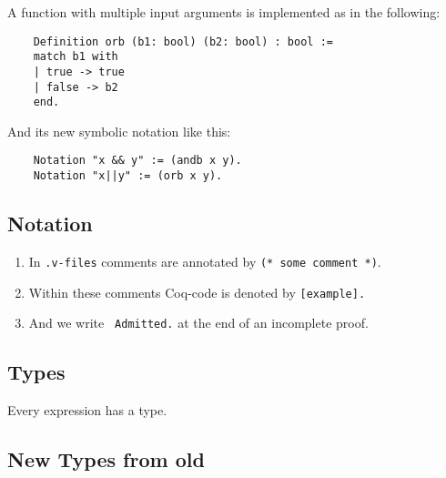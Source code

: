     A function with multiple input arguments is implemented as in the following:
    \begin{lstlisting}
    Definition orb (b1: bool) (b2: bool) : bool :=
    match b1 with
    | true -> true
    | false -> b2
    end.
    \end{lstlisting}
     
    And its new symbolic notation like this:
    \begin{lstlisting}
    Notation "x && y" := (andb x y).
    Notation "x||y" := (orb x y).
    \end{lstlisting}
    
     
\subsection{Notation}
     
    \begin{enumerate}
     \item In \texttt{.v-files} comments are annotated by \lstinline!(* some comment *)!. 
     \item Within these comments Coq-code is denoted by \lstinline![example].! 
     \item And we write \lstinline! Admitted.! at the end of an incomplete proof.    
     \end{enumerate}
     
     
\subsection{Types}

     Every expression has a type.
   
\subsection{New Types from old}

